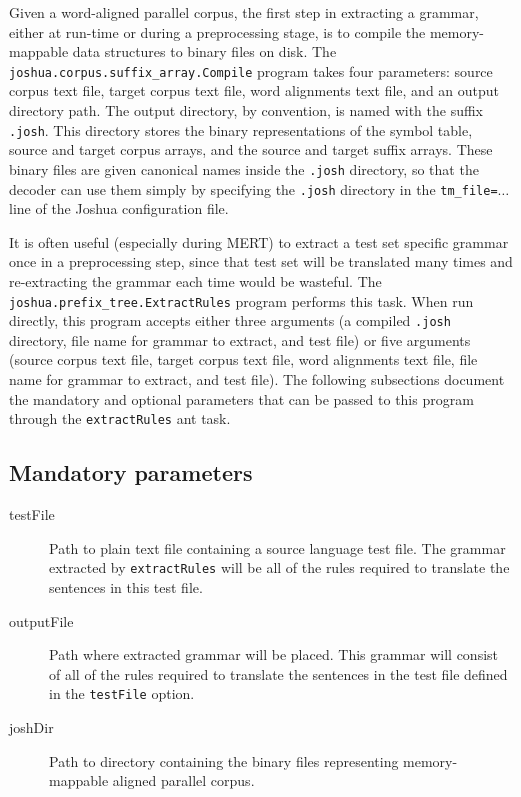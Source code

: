 \documentclass{pbml}
\begin{document}
Given a word-aligned parallel corpus, the first step in extracting a grammar, either at run-time or during a preprocessing stage, is to compile the memory-mappable data structures to binary files on disk. The {\tt joshua.corpus.suffix\_array.Compile} program takes four parameters: source corpus text file, target corpus text file, word alignments text file, and an output directory path. 
The output directory, by convention, is named with the suffix {\tt {\tt .josh}}. This directory stores the binary representations of the symbol table, source and target corpus arrays, and the source and target suffix arrays. 
%
These binary files are given canonical names inside the {\tt {\tt .josh}} directory, so that the decoder can use them simply by specifying the {\tt .josh} directory in the {\tt tm\_file=$\ldots$} line of the Joshua configuration file. 

It is often useful (especially during MERT) to extract a test set specific grammar once in a preprocessing step, since that test set will be translated many times and re-extracting the grammar each time would be wasteful. The {\tt joshua.prefix\_tree.ExtractRules} program performs this task. When run directly, this program accepts either three arguments (a compiled {\tt .josh} directory, file name for grammar to extract, and test file) or five arguments (source corpus text file, target corpus text file, word alignments text file, file name for grammar to extract, and test file). 
The following subsections document the mandatory and optional parameters that can be passed to this program through the {\tt extractRules} ant task.

\subsection{Mandatory parameters}
\begin{description}

	\item[testFile] Path to plain text file containing a source language test file. The grammar extracted by {\tt extractRules} will be all of the rules required to translate the sentences in this test file.

	\item[outputFile] Path where extracted grammar will be placed. This grammar will consist of all of the rules required to translate the sentences in the test file defined in the {\tt testFile} option.

	\item[joshDir] Path to directory containing the binary files representing memory-mappable aligned parallel corpus.

\end{description}
\end{document}
